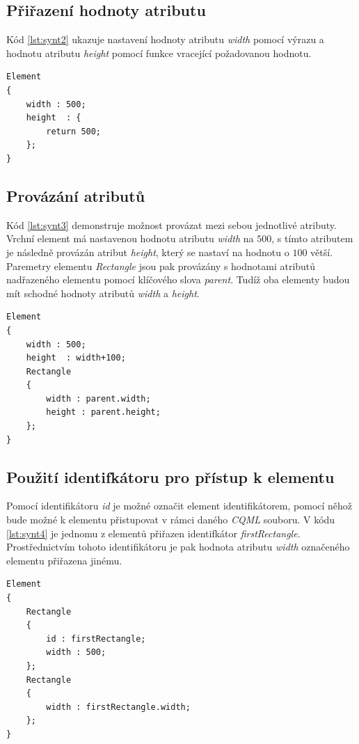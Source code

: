 \documentclass[11pt,twoside,a4paper]{book}
\begin{document}
\subsection{Přiřazení hodnoty atributu}
Kód \ref{lst:synt2} ukazuje nastavení hodnoty atributu \textit{width} pomocí výrazu a hodnotu atributu \textit{height} pomocí funkce vracející požadovanou hodnotu.
\begin{lstlisting}[float,frame=single,caption=Syntaxe přiřazení hodnoty elementu pomocí výrazu nebo funkce.,label=lst:synt2]
Element
{
	width : 500;
	height  : {
		return 500;
	};
}
\end{lstlisting}

\subsection{Provázání atributů}
Kód \ref{lst:synt3} demonstruje možnost provázat mezi sebou jednotlivé atributy. Vrchní element má nastavenou hodnotu atributu \textit{width} na $500$, s tímto atributem je následně provázán atribut \textit{height}, který se nastaví na hodnotu o $100$ větší. Paremetry elementu \textit{Rectangle} jsou pak provázány s hodnotami atributů nadřazeného elementu pomocí klíčového slova \textit{parent}. Tudíž oba elementy budou mít schodné hodnoty atributů \textit{width} a \textit{height}.
\begin{lstlisting}[frame=single,caption=Ukázka provázání atributů mezi sebou.,label=lst:synt3]
Element
{
	width : 500;
	height  : width+100;
	Rectangle
	{
		width : parent.width;
		height : parent.height;
	};
}
\end{lstlisting}


\subsection{Použití identifkátoru pro přístup k elementu}
Pomocí identifikátoru \textit{id} je možné označit element identifikátorem, pomocí něhož bude možné k elementu přistupovat v rámci daného \textit{CQML} souboru. V kódu \ref{lst:synt4} je jednomu z elementů přiřazen identifkátor \textit{firstRectangle}. Prostřednictvím tohoto identifikátoru je pak hodnota atributu \textit{width} označeného elementu přiřazena jinému.
\begin{lstlisting}[float,frame=single,caption=Ukázka přístupu k elementu a jeho atributům pomocí identifikátoru.,label=lst:synt4]
Element
{
	Rectangle
	{
		id : firstRectangle;
		width : 500;
	};
	Rectangle
	{
		width : firstRectangle.width;
	};
}
\end{lstlisting}
\end{document}
